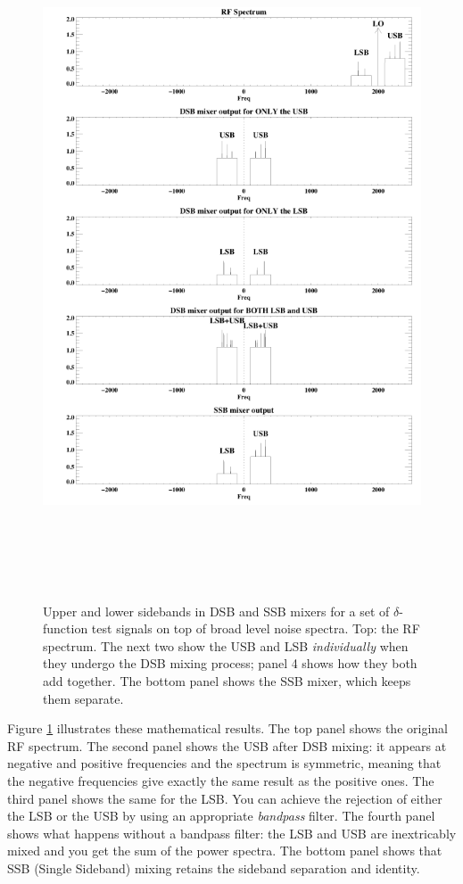 \documentclass[11pt,preprint]{aastex}
\begin{document}
\begin{figure}[p!]
\hspace{-0.7in}
  \includegraphics[width=7.5in, height=8.0in]{sideband.png}
\caption{Upper and lower sidebands in DSB and SSB mixers for a set of
$\delta$-function test signals on top of broad level noise spectra. Top:
  the RF
spectrum. The next two show the USB and LSB {\it individually} when
they undergo the DSB mixing process; panel 4 shows how they both add
together. The bottom panel shows the SSB mixer, which keeps them
separate. \label{sideband}}
\end{figure}

Figure \ref{sideband} illustrates these mathematical results. The top
panel shows the original RF spectrum. The second panel shows the USB
after DSB mixing: it appears at negative and positive frequencies and
the spectrum is symmetric, meaning that the negative frequencies give
exactly the same result as the positive ones. The third panel shows the
same for the LSB. You can achieve the rejection of either the LSB or the
USB by using an appropriate {\it bandpass} filter. The fourth panel
shows what happens without a bandpass filter: the LSB and USB are
inextricably mixed and you get the sum of the power spectra. The bottom
panel shows that SSB (Single Sideband) mixing retains the sideband separation and
identity.
\end{document}
